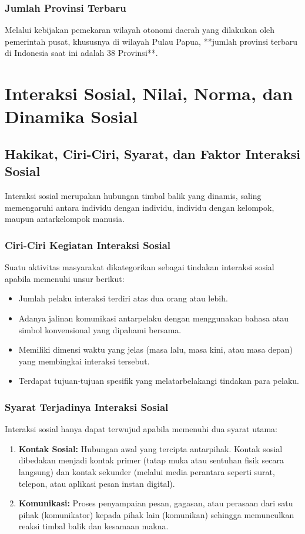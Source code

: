 \documentclass[12pt, a4paper]{article}
\begin{document}
\subsubsection{Jumlah Provinsi Terbaru}
Melalui kebijakan pemekaran wilayah otonomi daerah yang dilakukan oleh pemerintah pusat, khususnya di wilayah Pulau Papua, **jumlah provinsi terbaru di Indonesia saat ini adalah 38 Provinsi**.

\newpage
\section{Interaksi Sosial, Nilai, Norma, dan Dinamika Sosial}

\subsection{Hakikat, Ciri-Ciri, Syarat, dan Faktor Interaksi Sosial}
Interaksi sosial merupakan hubungan timbal balik yang dinamis, saling memengaruhi antara individu dengan individu, individu dengan kelompok, maupun antarkelompok manusia.

\subsubsection{Ciri-Ciri Kegiatan Interaksi Sosial}
Suatu aktivitas masyarakat dikategorikan sebagai tindakan interaksi sosial apabila memenuhi unsur berikut:
\begin{itemize}
    \item Jumlah pelaku interaksi terdiri atas dua orang atau lebih.
    \item Adanya jalinan komunikasi antarpelaku dengan menggunakan bahasa atau simbol konvensional yang dipahami bersama.
    \item Memiliki dimensi waktu yang jelas (masa lalu, masa kini, atau masa depan) yang membingkai interaksi tersebut.
    \item Terdapat tujuan-tujuan spesifik yang melatarbelakangi tindakan para pelaku.
\end{itemize}

\subsubsection{Syarat Terjadinya Interaksi Sosial}
Interaksi sosial hanya dapat terwujud apabila memenuhi dua syarat utama:
\begin{enumerate}
    \item \textbf{Kontak Sosial:} Hubungan awal yang tercipta antarpihak. Kontak sosial dibedakan menjadi kontak primer (tatap muka atau sentuhan fisik secara langsung) dan kontak sekunder (melalui media perantara seperti surat, telepon, atau aplikasi pesan instan digital).
    \item \textbf{Komunikasi:} Proses penyampaian pesan, gagasan, atau perasaan dari satu pihak (komunikator) kepada pihak lain (komunikan) sehingga memunculkan reaksi timbal balik dan kesamaan makna.
\end{enumerate}
\end{document}
